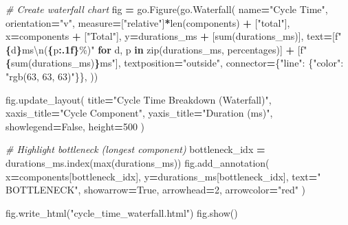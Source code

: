 \documentclass[
]{article}
\newenvironment{Shaded}{\begin{snugshade}}{\end{snugshade}}
\newcommand{\BuiltInTok}[1]{#1}
\newcommand{\CharTok}[1]{\textcolor[rgb]{0.31,0.60,0.02}{#1}}
\newcommand{\CommentTok}[1]{\textcolor[rgb]{0.56,0.35,0.01}{\textit{#1}}}
\newcommand{\ControlFlowTok}[1]{\textcolor[rgb]{0.13,0.29,0.53}{\textbf{#1}}}
\newcommand{\DecValTok}[1]{\textcolor[rgb]{0.00,0.00,0.81}{#1}}
\newcommand{\KeywordTok}[1]{\textcolor[rgb]{0.13,0.29,0.53}{\textbf{#1}}}
\newcommand{\NormalTok}[1]{#1}
\newcommand{\OperatorTok}[1]{\textcolor[rgb]{0.81,0.36,0.00}{\textbf{#1}}}
\newcommand{\SpecialCharTok}[1]{\textcolor[rgb]{0.81,0.36,0.00}{\textbf{#1}}}
\newcommand{\SpecialStringTok}[1]{\textcolor[rgb]{0.31,0.60,0.02}{#1}}
\newcommand{\StringTok}[1]{\textcolor[rgb]{0.31,0.60,0.02}{#1}}
\newcommand{\VariableTok}[1]{\textcolor[rgb]{0.00,0.00,0.00}{#1}}
\begin{document}
\begin{Shaded}
\begin{Highlighting}[]
\CommentTok{\# Create waterfall chart}
\NormalTok{fig }\OperatorTok{=}\NormalTok{ go.Figure(go.Waterfall(}
\NormalTok{    name}\OperatorTok{=}\StringTok{"Cycle Time"}\NormalTok{, orientation}\OperatorTok{=}\StringTok{"v"}\NormalTok{,}
\NormalTok{    measure}\OperatorTok{=}\NormalTok{[}\StringTok{"relative"}\NormalTok{]}\OperatorTok{*}\BuiltInTok{len}\NormalTok{(components) }\OperatorTok{+}\NormalTok{ [}\StringTok{"total"}\NormalTok{],}
\NormalTok{    x}\OperatorTok{=}\NormalTok{components }\OperatorTok{+}\NormalTok{ [}\StringTok{"Total"}\NormalTok{],}
\NormalTok{    y}\OperatorTok{=}\NormalTok{durations\_ms }\OperatorTok{+}\NormalTok{ [}\BuiltInTok{sum}\NormalTok{(durations\_ms)],}
\NormalTok{    text}\OperatorTok{=}\NormalTok{[}\SpecialStringTok{f"}\SpecialCharTok{\{}\NormalTok{d}\SpecialCharTok{\}}\SpecialStringTok{ms}\CharTok{\textbackslash{}n}\SpecialStringTok{(}\SpecialCharTok{\{}\NormalTok{p}\SpecialCharTok{:.1f\}}\SpecialStringTok{\%)"} \ControlFlowTok{for}\NormalTok{ d, p }\KeywordTok{in} \BuiltInTok{zip}\NormalTok{(durations\_ms, percentages)] }\OperatorTok{+}\NormalTok{ [}\SpecialStringTok{f"}\SpecialCharTok{\{}\BuiltInTok{sum}\NormalTok{(durations\_ms)}\SpecialCharTok{\}}\SpecialStringTok{ms"}\NormalTok{],}
\NormalTok{    textposition}\OperatorTok{=}\StringTok{"outside"}\NormalTok{,}
\NormalTok{    connector}\OperatorTok{=}\NormalTok{\{}\StringTok{"line"}\NormalTok{: \{}\StringTok{"color"}\NormalTok{: }\StringTok{"rgb(63, 63, 63)"}\NormalTok{\}\},}
\NormalTok{))}

\NormalTok{fig.update\_layout(}
\NormalTok{    title}\OperatorTok{=}\StringTok{"Cycle Time Breakdown (Waterfall)"}\NormalTok{,}
\NormalTok{    xaxis\_title}\OperatorTok{=}\StringTok{"Cycle Component"}\NormalTok{,}
\NormalTok{    yaxis\_title}\OperatorTok{=}\StringTok{"Duration (ms)"}\NormalTok{,}
\NormalTok{    showlegend}\OperatorTok{=}\VariableTok{False}\NormalTok{,}
\NormalTok{    height}\OperatorTok{=}\DecValTok{500}
\NormalTok{)}

\CommentTok{\# Highlight bottleneck (longest component)}
\NormalTok{bottleneck\_idx }\OperatorTok{=}\NormalTok{ durations\_ms.index(}\BuiltInTok{max}\NormalTok{(durations\_ms))}
\NormalTok{fig.add\_annotation(}
\NormalTok{    x}\OperatorTok{=}\NormalTok{components[bottleneck\_idx], y}\OperatorTok{=}\NormalTok{durations\_ms[bottleneck\_idx],}
\NormalTok{    text}\OperatorTok{=}\StringTok{"🎯 BOTTLENECK"}\NormalTok{,}
\NormalTok{    showarrow}\OperatorTok{=}\VariableTok{True}\NormalTok{, arrowhead}\OperatorTok{=}\DecValTok{2}\NormalTok{, arrowcolor}\OperatorTok{=}\StringTok{"red"}
\NormalTok{)}

\NormalTok{fig.write\_html(}\StringTok{"cycle\_time\_waterfall.html"}\NormalTok{)}
\NormalTok{fig.show()}
\end{Highlighting}
\end{Shaded}
\end{document}
